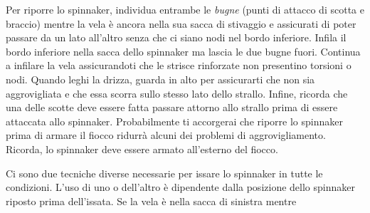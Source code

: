 Per riporre lo spinnaker, individua entrambe le \emph {bugne} (punti di attacco
di scotta e braccio) mentre la vela è ancora nella sua sacca di stivaggio e
assicurati di poter passare da un lato all'altro senza che ci siano nodi nel
bordo inferiore. Infila il bordo inferiore nella sacca dello spinnaker ma lascia
le due bugne fuori. Continua a infilare la vela assicurandoti che le strisce
rinforzate non presentino torsioni o nodi. Quando leghi la drizza, guarda in
alto per assicurarti che non sia aggrovigliata e che essa scorra sullo stesso
lato dello strallo. Infine, ricorda che una delle scotte deve essere fatta passare
attorno allo strallo prima di essere attaccata allo spinnaker. Probabilmente ti
accorgerai che riporre lo spinnaker prima di armare il fiocco ridurrà alcuni dei
problemi di aggrovigliamento. Ricorda, lo spinnaker deve essere armato
all'esterno del fiocco.

Ci sono due tecniche diverse necessarie per issare lo spinnaker in tutte le
condizioni. L'uso di uno o dell'altro è dipendente dalla posizione dello
spinnaker riposto prima dell'issata. Se la vela è nella sacca di sinistra mentre


